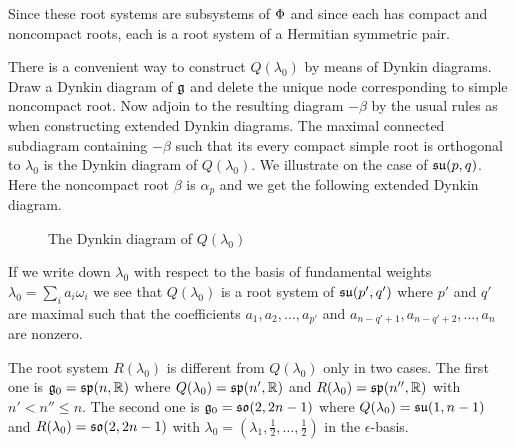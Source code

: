 Since these root systems are subsystems of $\Phi$ and since each has compact and noncompact roots, each is a root system of a Hermitian symmetric pair.

There is a convenient way to construct $Q(\lambda_0)$ by means of Dynkin diagrams. Draw a Dynkin diagram of $\mathfrak{g}$ and delete the unique node corresponding to simple noncompact root. Now adjoin to the resulting diagram $-\beta$ by the usual rules as when constructing extended Dynkin diagrams. The maximal connected subdiagram containing $-\beta$ such that its every compact simple root is orthogonal to $\lambda_0$ is the Dynkin diagram of $Q(\lambda_0)$. We illustrate on the case of $\mathfrak{su}(p,q)$. Here the noncompact root $\beta$ is $\alpha_p$ and we get the following extended Dynkin diagram.
\begin{figure}[H]\label{fig:Q}
  \begin{center}
  \end{center}\caption{The Dynkin diagram of $Q(\lambda_0)$} 
\end{figure}
If we write down $\lambda_0$ with respect to the basis of fundamental weights $\lambda_0 = \sum_i a_i \omega_i$ we see that $Q(\lambda_0)$ is a root system of $\mathfrak{su}(p',q')$ where $p'$ and $q'$ are maximal such that the coefficients $a_1,a_2,\ldots,a_{p'}$ and $a_{n-q'+1},a_{n-q'+2}, \ldots, a_n$ are nonzero.

The root system $R(\lambda_0)$ is different from $Q(\lambda_0)$ only in two cases. The first one is $\mathfrak{g}_0=\mathfrak{sp}(n,\mathbb{R})$ where $Q(\lambda_0) = \mathfrak{sp}(n',\mathbb{R})$ and $R(\lambda_0) = \mathfrak{sp}(n'',\mathbb{R})$ with $n' < n'' \leq n$. The second one is $\mathfrak{g}_0=\mathfrak{so}(2,2n-1)$ where $Q(\lambda_0) = \mathfrak{su}(1,n-1)$ and $R(\lambda_0) = \mathfrak{so}(2,2n-1)$ with $\lambda_0 = (\lambda_1,\frac{1}{2},\ldots,\frac{1}{2})$ in the $\epsilon$-basis.

